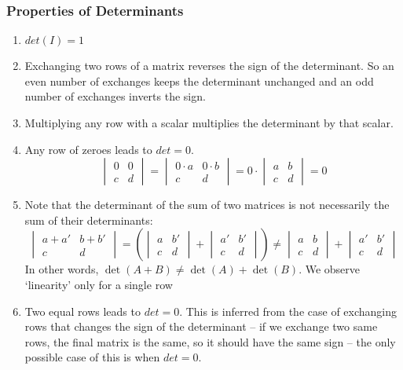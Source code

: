 \subsubsection*{Properties of Determinants}
\begin{enumerate}
    \item $det(I) = 1$ 
    \item Exchanging two rows of a matrix reverses the sign of the determinant. So an even number of exchanges keeps the determinant unchanged and an odd number of exchanges inverts the sign.
    \item Multiplying any row with a scalar multiplies the determinant by that scalar.
    \item Any row of zeroes leads to $det = 0$. \[
\begin{vmatrix}
0 & 0 \\
c & d
\end{vmatrix}
= 
\begin{vmatrix}
0 \cdot a & 0 \cdot b \\
c & d
\end{vmatrix}
=
0 \cdot
\begin{vmatrix}
a & b \\
c & d
\end{vmatrix}
= 0
\]
    \item Note that the determinant of the sum of two matrices is not necessarily the sum of their determinants:
\[
\begin{vmatrix}
a + a' & b + b' \\
c & d
\end{vmatrix} = \left(
\begin{vmatrix}
a  & b' \\
c & d
\end{vmatrix} + \begin{vmatrix}
a' & b' \\
c & d
\end{vmatrix} \right)
\neq
\begin{vmatrix}
a & b \\
c & d
\end{vmatrix}
+
\begin{vmatrix}
a' & b' \\
c & d
\end{vmatrix}
\]
In other words, \( \det(A + B) \neq \det(A) + \det(B) \). We observe `linearity' only for a single row
    \item Two equal rows leads to $det = 0$. This is inferred from the case of exchanging rows that changes the sign of the determinant – if we exchange two same rows, the final matrix is the same, so it should have the same sign – the only possible case of this is when $det=0$.

\end{enumerate}
